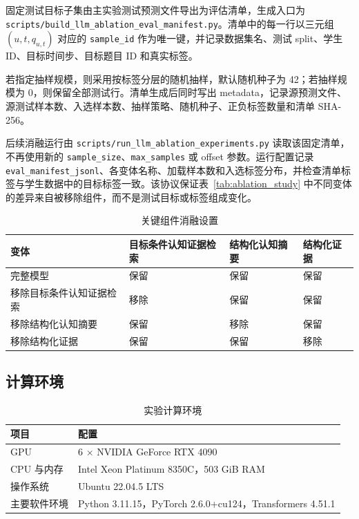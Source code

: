 \documentclass[UTF8,a4paper,12pt]{ctexart}
\numberwithin{table}{section}
\begin{document}
固定测试目标子集由主实验测试预测文件导出为评估清单，生成入口为 \texttt{scripts/build\_llm\_ablation\_eval\_manifest.py}。清单中的每一行以三元组 \((u,t,q_{u,t})\) 对应的 \texttt{sample\_id} 作为唯一键，并记录数据集名、测试 split、学生 ID、目标时间步、目标题目 ID 和真实标签。

若指定抽样规模，则采用按标签分层的随机抽样，默认随机种子为 42；若抽样规模为 0，则保留全部测试行。清单生成后同时写出 metadata，记录源预测文件、源测试样本数、入选样本数、抽样策略、随机种子、正负标签数量和清单 SHA-256。

后续消融运行由 \texttt{scripts/run\_llm\_ablation\_experiments.py} 读取该固定清单，不再使用新的 \texttt{sample\_size}、\texttt{max\_samples} 或 offset 参数。运行配置记录 \texttt{eval\_manifest\_jsonl}、各变体名称、加载样本数和入选标签分布，并检查清单标签与学生数据中的目标标签一致。该协议保证表~\ref{tab:ablation_study} 中不同变体的差异来自被移除组件，而不是测试目标或标签组成变化。

\begin{table}[htbp]
\centering
\small
\caption{关键组件消融设置}
\label{tab:appendix-ablation-design}
\begin{tabularx}{\textwidth}{p{3.3cm}XXX}
\toprule
\textbf{变体} & \textbf{目标条件认知证据检索} & \textbf{结构化认知摘要} & \textbf{结构化证据} \\
\midrule
完整模型 & 保留 & 保留 & 保留 \\
移除目标条件认知证据检索 & 移除 & 保留 & 保留 \\
移除结构化认知摘要 & 保留 & 移除 & 保留 \\
移除结构化证据 & 保留 & 保留 & 移除 \\
\bottomrule
\end{tabularx}
\end{table}

\subsection{计算环境}

\begin{table}[htbp]
\centering
\small
\caption{实验计算环境}
\label{tab:appendix-experiment-environment}
\begin{tabular}{ll}
\toprule
\textbf{项目} & \textbf{配置} \\
\midrule
GPU & 6 $\times$ NVIDIA GeForce RTX 4090 \\
CPU 与内存 & Intel Xeon Platinum 8350C，503 GiB RAM \\
操作系统 & Ubuntu 22.04.5 LTS \\
主要软件环境 & Python 3.11.15，PyTorch 2.6.0+cu124，Transformers 4.51.1 \\
\bottomrule
\end{tabular}
\end{table}
\end{document}
